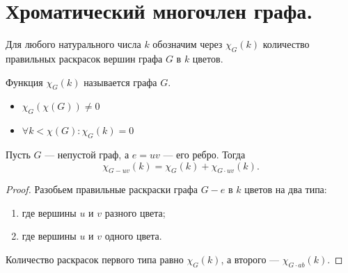 \section{Хроматический многочлен графа.}
\begin{definition}
    Для любого натурального числа $k$  обозначим через $\chi_{G}(k)$ количество правильных раскрасок вершин графа $G$ в $k$ цветов.

	Функция  $\chi_G(k)$ называется  графа $G$.
\end{definition}
\begin{note}
    \begin{itemize}
		\item $\chi_G(\chi(G)) \neq 0$ 
		\item $ \forall k < \chi(G) \colon\chi_G(k) = 0$
    \end{itemize}
\end{note}

\begin{lemma}\label{lm:coloring_12}
	Пусть $G$ --- непустой граф, а $e = uv$ --- его ребро. Тогда  \[
	\chi_{G-uv}(k) = \chi_G(k) + \chi_{G \cdot uv}(k)
	.\] 
\end{lemma}
\begin{proof}
	Разобьем правильные раскраски графа $G-e$ в $k$ цветов на два типа:
	\begin{enumerate}
		\item где вершины $u$ и $v$ разного цвета;
		\item где вершины $u$ и $v$ одного цвета.
	\end{enumerate}
	Количество раскрасок первого типа равно $\chi_{G}(k)$, а второго --- $\chi_{G \cdot  ab}(k)$.
\end{proof}

